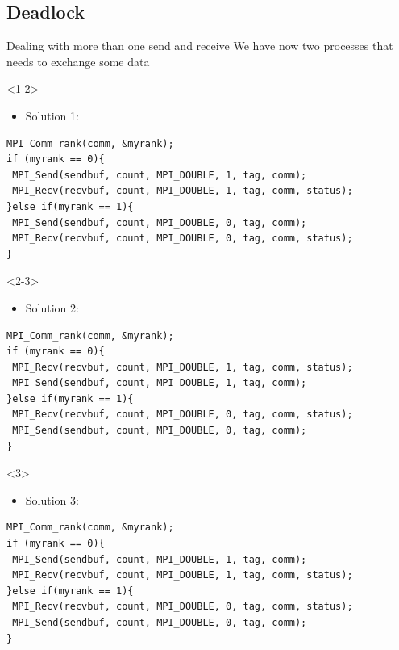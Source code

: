 \documentclass[xcolor={svgnames,usenames}]{beamer}
\begin{document}
\subsection{Deadlock}

\begin{frame}[fragile]{Dealing with more than one send and receive}
We have now two processes that needs to exchange some data

\begin{onlyenv}<1-2>
\begin{itemize}
	\item Solution 1:
\end{itemize}
{\footnotesize
\begin{verbatim}
MPI_Comm_rank(comm, &myrank);
if (myrank == 0){
 MPI_Send(sendbuf, count, MPI_DOUBLE, 1, tag, comm);
 MPI_Recv(recvbuf, count, MPI_DOUBLE, 1, tag, comm, status);
}else if(myrank == 1){
 MPI_Send(sendbuf, count, MPI_DOUBLE, 0, tag, comm); 
 MPI_Recv(recvbuf, count, MPI_DOUBLE, 0, tag, comm, status);
}
\end{verbatim}
}
\end{onlyenv}

\begin{onlyenv}<2-3>
\begin{itemize}
	\item Solution 2:
\end{itemize}
{\footnotesize
\begin{verbatim}
MPI_Comm_rank(comm, &myrank);
if (myrank == 0){
 MPI_Recv(recvbuf, count, MPI_DOUBLE, 1, tag, comm, status);
 MPI_Send(sendbuf, count, MPI_DOUBLE, 1, tag, comm);
}else if(myrank == 1){ 
 MPI_Recv(recvbuf, count, MPI_DOUBLE, 0, tag, comm, status);
 MPI_Send(sendbuf, count, MPI_DOUBLE, 0, tag, comm);
}
\end{verbatim}
}
\end{onlyenv}

\begin{onlyenv}<3>
\begin{itemize}
	\item Solution 3:
\end{itemize}
{\footnotesize
\begin{verbatim}
MPI_Comm_rank(comm, &myrank);
if (myrank == 0){
 MPI_Send(sendbuf, count, MPI_DOUBLE, 1, tag, comm);
 MPI_Recv(recvbuf, count, MPI_DOUBLE, 1, tag, comm, status);
}else if(myrank == 1){
 MPI_Recv(recvbuf, count, MPI_DOUBLE, 0, tag, comm, status);
 MPI_Send(sendbuf, count, MPI_DOUBLE, 0, tag, comm); 
}
\end{verbatim}
}
\end{onlyenv}
\vfill
\end{frame}
\end{document}
